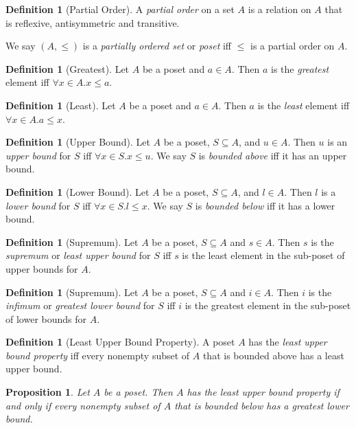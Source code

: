 \documentclass{book}
\newtheorem{prop}[ax]{Proposition}
\theoremstyle{definition}
\newtheorem{df}[ax]{Definition}
\begin{document}
\begin{df}[Partial Order]
A \emph{partial order} on a set $A$ is a relation on $A$ that is reflexive, antisymmetric and transitive.

We say $(A, \leq)$ is a \emph{partially ordered set} or \emph{poset} iff $\leq$ is a partial order on $A$.
\end{df}

\begin{df}[Greatest]
Let $A$ be a poset and $a \in A$. Then $a$ is the \emph{greatest} element iff $\forall x \in A. x \leq a$.
\end{df}

\begin{df}[Least]
Let $A$ be a poset and $a \in A$. Then $a$ is the \emph{least} element iff $\forall x \in A. a \leq x$.
\end{df}

\begin{df}[Upper Bound]
Let $A$ be a poset, $S \subseteq A$, and $u \in A$. Then $u$ is an \emph{upper bound} for $S$ iff $\forall x \in S. x \leq u$. We say $S$ is \emph{bounded above} iff it has an upper bound.
\end{df}

\begin{df}[Lower Bound]
Let $A$ be a poset, $S \subseteq A$, and $l \in A$. Then $l$ is a \emph{lower bound} for $S$ iff $\forall x \in S. l \leq x$. We say $S$ is \emph{bounded below} iff it has a lower bound.
\end{df}

\begin{df}[Supremum]
Let $A$ be a poset, $S \subseteq A$ and $s \in A$. Then $s$ is the \emph{supremum} or \emph{least upper bound} for $S$ iff $s$ is the least element in the sub-poset of upper bounds for $A$.
\end{df}

\begin{df}[Supremum]
Let $A$ be a poset, $S \subseteq A$ and $i \in A$. Then $i$ is the \emph{infimum} or \emph{greatest lower bound} for $S$ iff $i$ is the greatest element in the sub-poset of lower bounds for $A$.
\end{df}

\begin{df}[Least Upper Bound Property]
A poset $A$ has the \emph{least upper bound property} iff every nonempty subset of $A$ that is bounded above has a least upper bound.
\end{df}

\begin{prop}
Let $A$ be a poset. Then $A$ has the least upper bound property if and only if every nonempty subset of $A$ that is bounded below has a greatest lower bound.
\end{prop}
\end{document}
